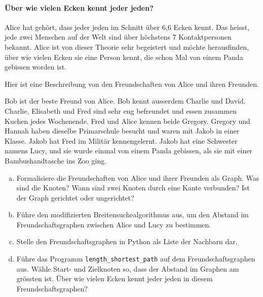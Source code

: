 \paragraph{Über wie vielen Ecken kennt jeder jeden?}
Alice hat gehört, dass jeder jeden im Schnitt über 6,6 Ecken kennt. Das heisst, jede zwei Menschen auf der Welt sind über höchstens 7 Kontaktpersonen bekannt. Alice ist von dieser Theorie sehr begeistert und möchte herausfinden, über wie vielen Ecken sie eine Person kennt, die schon Mal von einem Panda gebissen worden ist.

\begin{aufgabe}\label{aufgabe_panda_gebissen}
Hier ist eine Beschreibung von den Freundschaften von Alice und ihren Freunden.
\begin{displayquote}
Bob ist der beste Freund von Alice. Bob kennt ausserdem Charlie und David. Charlie, Elisabeth und Fred sind sehr eng befreundet und essen zusammen Kuchen jedes Wochenende. Fred und Alice kennen beide Gregory. Gregory und Hannah haben dieselbe Primarschule besucht und waren mit Jakob in einer Klasse. Jakob hat Fred im Militär kennengelernt. Jakob hat eine Schwester namens Lucy, und sie wurde einmal von einem Panda gebissen, als sie mit einer Bambushandtasche ins Zoo ging.
\end{displayquote}

\begin{enumerate}[(a)]
    \item Formalisiere die Freundschaften von Alice und ihrer Freunden als Graph. Was sind die Knoten? Wann sind zwei Knoten durch eine Kante verbunden? Ist der Graph gerichtet oder ungerichtet?
    \item Führe den modifizierten Breitensuchealgorithmus aus, um den Abstand im Freundschaftsgraphen zwischen Alice und Lucy zu bestimmen.
    \item Stelle den Freundschaftsgraphen in Python als Liste der Nachbarn dar.
    \item Führe das Programm \texttt{length\_shortest\_path} auf dem Freundschaftsgraphen aus. Wähle Start- und Zielknoten so, dass der Abstand im Graphen am grössten ist. Über wie vielen Ecken kennt jeder jeden in diesem Freundschaftsgraphen? 
\end{enumerate}

\end{aufgabe}

